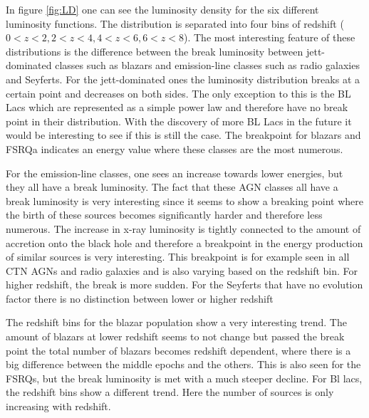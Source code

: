 \documentclass{article}
\begin{document}
In figure \ref{fig:LD} one can see the luminosity density for the six different luminosity functions. The distribution is 
separated into four bins of redshift ($0<z<2,2<z<4,4<z<6,6<z<8$). %
The most interesting feature of these distributions is the difference between the break luminosity between jett-dominated classes such as blazars and emission-line classes such as radio galaxies and Seyferts.
For the jett-dominated ones the luminosity distribution breaks at a certain point and decreases on both sides. The only exception to this is the BL Lacs which are represented as a simple power law and therefore have no
break point in their distribution. With the discovery of more BL Lacs in the future it would be interesting to see if this is still the case. %
The breakpoint for blazars and FSRQa indicates an energy value where these classes are the most numerous.



For the emission-line classes, one sees an increase towards lower energies, but they all have a break luminosity. The fact that these AGN classes all have a break luminosity is very interesting since it seems to show 
a breaking point where the birth of these sources becomes significantly harder and therefore less numerous. The increase in x-ray luminosity is tightly connected to the amount of accretion onto the black hole and therefore
a breakpoint in the energy production of similar sources is very interesting.
This breakpoint is for example seen in all CTN AGNs and radio galaxies and is also varying based on the redshift bin. For higher redshift, the break is more sudden. For the Seyferts that have no evolution factor there is no distinction between lower or higher redshift

The redshift bins for the blazar population show a very interesting trend. The amount of blazars at lower redshift seems to not change but passed the break point the total number of blazars becomes redshift dependent, where there is a big difference between the middle epochs and the others. 
This is also seen for the FSRQs, but the break luminosity is met with a much steeper decline. For Bl lacs, the redshift bins show a different trend. Here the number of sources is only increasing with redshift. 
\end{document}
